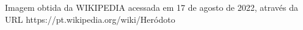 \documentclass[
12pt,		%
openright,	%
twoside,  %
a4paper,			%
chapter=TITLE,		%
english,			%
french,				%
spanish,			%
brazil				%
]{USPSC-classe/USPSC}
\begin{document}
\begin{flushleft}
\begin{flushleft}
\begin{flushleft}
\begin{flushleft}
\begin{flushleft}
\begin{flushleft}
\begin{flushleft}
\begin{flushleft}
\begin{flushleft}
\begin{flushleft}
[WIKIPEDIA, 2022] Imagem obtida da WIKIPEDIA acessada em 17 de agosto de 2022, atrav\'es da URL https://pt.wikipedia.org/wiki/Her\'odoto
\end{flushleft}


\end{flushleft}


\end{flushleft}


\end{flushleft}


\end{flushleft}


\end{flushleft}


\end{flushleft}


\end{flushleft}


\end{flushleft}


\end{flushleft}
\end{document}
